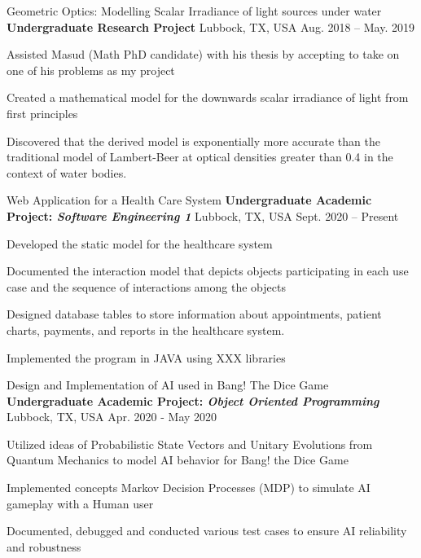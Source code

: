\begin{cventries}
  \cventry
  {Geometric Optics: Modelling Scalar Irradiance of light sources under water}
  {\textbf{Undergraduate Research Project}}
    {Lubbock, TX, USA}
    {Aug. 2018 -- May. 2019}
    {
      \begin{cvitems}
      \item{Assisted Masud (Math PhD candidate) with his thesis by accepting to take on one of his problems as my project}
  \item{Created a mathematical model for the downwards scalar irradiance of light from ﬁrst principles}
  \item{Discovered that the derived model is exponentially more accurate than the traditional model of Lambert-Beer at optical densities greater than 0.4 in the context of water bodies.}
      \end{cvitems}
    }

  \cventry
  {Web Application for a Health Care System}
  {\textbf{Undergraduate Academic Project: \textit{Software Engineering 1}}}
    {Lubbock, TX, USA}
    {Sept. 2020 -- Present}
    {
      \begin{cvitems}
      \item{Developed the static model for the healthcare system}
    \item{Documented the interaction model that depicts objects participating in each use case and the sequence of interactions among the objects}
    \item{Designed database tables to store information about appointments, patient charts, payments, and reports in the healthcare system.}
    \item{Implemented the program in JAVA using XXX libraries}
      \end{cvitems}
    }

  \cventry
  {Design and Implementation of AI used in Bang! The Dice Game}
  {\textbf{Undergraduate Academic Project: \textit{Object Oriented Programming}}}
    {Lubbock, TX, USA}
    {Apr. 2020 - May 2020}
    {
      \begin{cvitems}
      \item{Utilized ideas of Probabilistic State Vectors and Unitary Evolutions from Quantum Mechanics to model AI behavior for Bang! the Dice Game}
      \item{Implemented concepts Markov Decision Processes (MDP) to simulate AI gameplay with a Human user}
      \item{Documented, debugged and conducted various test cases to ensure AI reliability and robustness}
      \end{cvitems}
    }


\end{cventries}
